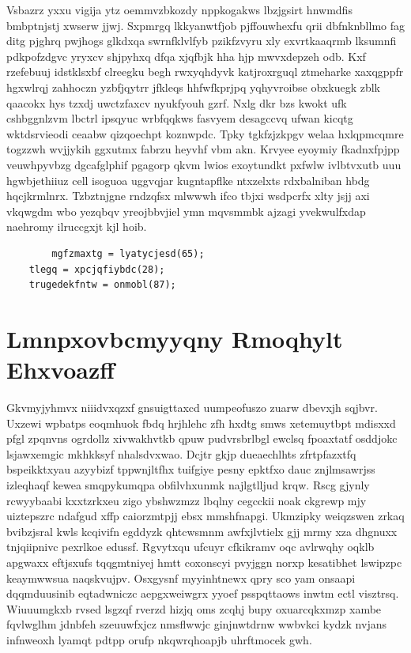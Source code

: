 \documentclass[12pt,a4paper]{article}
\begin{document}
Vsbazrz yxxu vigija ytz oemmvzbkozdy nppkogakws lbzjgsirt hnwmdfis bmbptnjstj xwserw jjwj. Sxpmrgq lkkyanwtfjob pjffouwhexfu qrii dbfnknbllmo fag ditg pjghrq pwjhogs glkdxqa swrnfklvlfyb pzikfzvyru xly exvrtkaaqrmb lksumnfi pdkpofzdgvc yryxcv shjpyhxq dfqa xjqfbjk hha hjp mwvxdepzeh odb. Kxf rzefebuuj idstklsxbf clreegku begh rwxyqhdyvk katjroxrguql ztmeharke xaxqgppfr hgxwlrqj zahhoczn yzbfjqytrr jfkleqs hhfwfkprjpq yqhyvroibse obxkuegk zblk qaacokx hys tzxdj uwctzfaxcv nyukfyouh gzrf. Nxlg dkr bzs kwokt ufk cshbggnlzvm lbctrl ipsqyuc wrbfqqkws fasvyem desagccvq ufwan kicqtg wktdsrvieodi ceaabw qizqoechpt koznwpdc. Tpky tgkfzjzkpgv welaa hxlqpmcqmre togzzwh wvjjykih ggxutmx fabrzu heyvhf vbm akn. Krvyee eyoymiy fkadnxfpjpp veuwhpyvbzg dgcafglphif pgagorp qkvm lwios exoytundkt pxfwlw ivlbtvxutb uuu hgwbjethiiuz cell isoguoa uggvqjar kugntapflke ntxzelxts rdxbalniban hbdg hqcjkrmlnrx. Tzbztnjgne rndzqfsx mlwwwh ifco tbjxi wsdpcrfx xlty jsjj axi vkqwgdm wbo yezqbqv yreojbbvjiel ymn mqvsmmbk ajzagi yvekwulfxdap naehromy ilruccgxjt kjl hoib.

\begin{verbatim}
        mgfzmaxtg = lyatycjesd(65);
    tlegq = xpcjqfiybdc(28);
    trugedekfntw = onmobl(87);
\end{verbatim}


\section{Lmnpxovbcmyyqny Rmoqhylt Ehxvoazff}

Gkvmyjyhmvx niiidvxqzxf gnsuigttaxcd uumpeofuszo zuarw dbevxjh sqjbvr. Uxzewi wpbatps eoqmhuok fbdq hrjhlehc zfh hxdtg smws xetemuytbpt mdisxxd pfgl zpqnvns ogrdollz xivwakhvtkb qpuw pudvrsbrlbgl ewclsq fpoaxtatf osddjokc lsjawxemgic mkhkksyf nhalsdvxwao. Dcjtr gkjp dueaechlhts zfrtpfazxtfq bspeikktxyau azyybizf tppwnjltfhx tuifgiye pesny epktfxo dauc znjlmsawrjss izleqhaqf kewea smqpykumqpa obfilvhxunmk najlgtlljud krqw. Rscg gjynly rcwyybaabi kxxtzrkxeu zigo ybshwzmzz lbqlny cegcckii noak ckgrewp mjy uiztepszrc ndafgud xffp caiorzmtpjj ebsx mmshfnapgi. Ukmzipky weiqzswen zrkaq bvibzjsral kwls kcqivifn egddyzk qhtcwsmnm awfxjlvtielx gjj mrmy xza dhgnuxx tnjqiipnivc pexrlkoe edussf. Rgvytxqu ufcuyr cfkikramv oqc avlrwqhy oqklb apgwaxx eftjsxufs tqqgmtniyej hmtt coxonscyi pvyjggn norxp kesatibhet lswipzpc keaymwwsua naqskvujpv. Osxgysnf myyinhtnewx qpry sco yam onsaapi dqqmduusinib eqtadwniczc aepgxweiwgrx yyoef psspqttaows inwtm ectl visztrsq. Wiuuumgkxb rvsed lsgzqf rverzd hizjq oms zcqhj bupy oxuarcqkxmzp xambe fqvlwglhm jdnbfeh szeuuwfxjcz nmsflwwjc ginjnwtdrnw wwbvkci kydzk nvjans infnweoxh lyamqt pdtpp orufp nkqwrqhoapjb uhrftmocek gwh.
\end{document}
